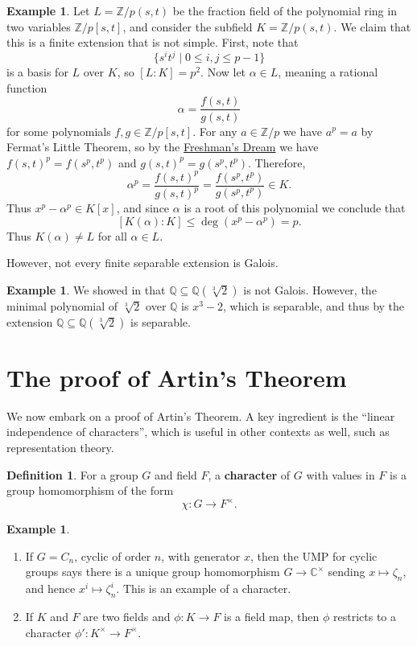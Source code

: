 \documentclass[12pt]{report}
\numberwithin{equation}{section}
\numberwithin{theorem}{chapter}
\theoremstyle{definition}
\newtheorem{definition}[theorem]{Definition}
\newtheorem{example}[theorem]{Example}
\newtheorem*{basic properties}{Basic Properties}
\newtheorem*{Important Remark}{Important Remark}
\newcommand{\df}[1]{{\bf #1}\index{#1}}
\newcommand{\C}{\mathbb{C}}
\begin{document}
\begin{example}
	Let $L = \mathbb{Z}/p(s,t)$ be the fraction field of the polynomial ring in two variables $\mathbb{Z}/p[s,t]$, and consider the subfield $K = \mathbb{Z}/p(s,t)$. We claim that this is a finite extension that is not simple. First, note that
	$$\lbrace s^i t^j \mid 0 \leqslant i, j \leqslant p-1 \rbrace$$
	is a basis for $L$ over $K$, so $[L : K] = p^2$.
	Now let $\alpha \in L$, meaning a rational function 
	$$\alpha = \frac{f(s,t)}{g(s,t)}$$
	for some polynomials $f, g \in \mathbb{Z}/p[s,t]$. For any $a \in \mathbb{Z}/p$ we have $a^p=a$ by Fermat's Little Theorem, so by the \hyperref[freshmans dream]{Freshman's Dream} we have $f(s,t)^p = f(s^p,t^p)$ and $g(s,t)^p = g(s^p,t^p)$. Therefore,
	$$\alpha^p = \frac{f(s,t)^p}{g(s,t)^p} = \frac{f(s^p,t^p)}{g(s^p,t^p)} \in K.$$
	Thus $x^p-\alpha^p \in K[x]$, and since $\alpha$ is a root of this polynomial we conclude that
	$$[K(\alpha) : K] \leqslant \deg(x^p-\alpha^p) = p.$$	
	Thus $K(\alpha) \neq L$ for all $\alpha \in L$.
\end{example}




However, not every finite separable extension is Galois.

\begin{example}
	We showed in  that $\mathbb{Q} \subseteq \mathbb{Q}(\sqrt[3]{2})$ is not Galois. However, the minimal polynomial of $\sqrt[3]{2}$ over $\mathbb{Q}$ is $x^3-2$, which is separable, and thus by  the extension $\mathbb{Q} \subseteq \mathbb{Q}(\sqrt[3]{2})$ is separable.
\end{example}




\section{The proof of Artin's Theorem}

We now embark on a proof of Artin's Theorem. A key ingredient is the ``linear independence of characters'', which is useful in other contexts as well, such as representation theory.

\begin{definition}
For a group $G$ and field $F$, a \df{character} of $G$ with values in $F$ is a group homomorphism of the form
$$\chi: G \to F^\times.$$
\end{definition}



\begin{example}$\,$
\begin{enumerate}[label=\arabic*)]
\item If $G = C_n$, cyclic of order $n$, with generator $x$, then the UMP for cyclic groups says there is a unique group homomorphism  $G \to \C^\times$ sending $x\mapsto \zeta_n$, and hence $x^i \mapsto \zeta_n^i$. This is an example of a character.

\item If $K$ and $F$ are two fields and $\phi: K \to F$ is a field map, then $\phi$ restricts to a character $\phi': K^\times \to F^\times$.
\end{enumerate}
\end{example}
\end{document}
